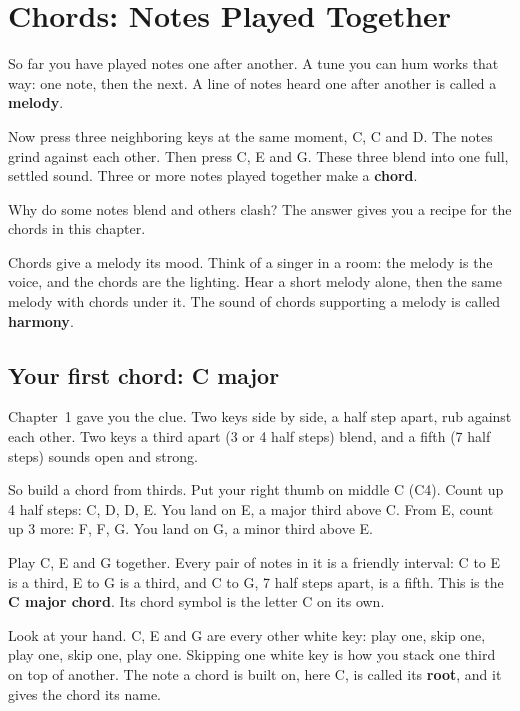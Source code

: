 \chapter{Chords: Notes Played Together}
\label{ch:chords-by-shape}
\chapterline

So far you have played notes one after another. A tune you can hum works that way: one note, then the next. A line of notes heard one after another is called a \textbf{melody}.

Now press three neighboring keys at the same moment, C, C\sh{} and D.  The notes grind against each other. Then press C, E and G.  These three blend into one full, settled sound. Three or more notes played together make a \textbf{chord}.

Why do some notes blend and others clash? The answer gives you a recipe for the chords in this chapter.

Chords give a melody its mood. Think of a singer in a room: the melody is the voice, and the chords are the lighting. Hear a short melody alone,  then the same melody with chords under it.  The sound of chords supporting a melody is called \textbf{harmony}.

\section{Your first chord: C major}

Chapter~1 gave you the clue. Two keys side by side, a half step apart, rub against each other. Two keys a third apart (3 or 4 half steps) blend, and a fifth (7 half steps) sounds open and strong.

So build a chord from thirds. Put your right thumb on middle C (C4). Count up 4 half steps: C\sh, D, D\sh, E. You land on E, a major third above C. From E, count up 3 more: F, F\sh, G. You land on G, a minor third above E.

Play C, E and G together.  Every pair of notes in it is a friendly interval: C to E is a third, E to G is a third, and C to G, 7 half steps apart, is a fifth. This is the \textbf{C major chord}. Its chord symbol is the letter C on its own.

Look at your hand. C, E and G are every other white key: play one, skip one, play one, skip one, play one. Skipping one white key is how you stack one third on top of another. The note a chord is built on, here C, is called its \textbf{root}, and it gives the chord its name.

